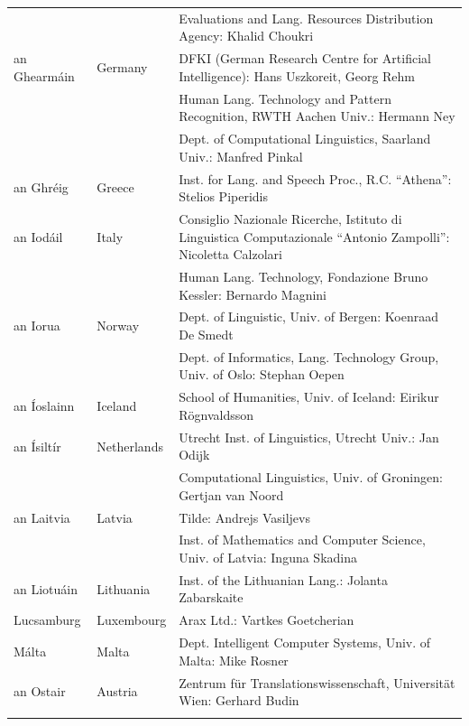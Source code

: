 \documentclass[]{../../metanetpaper}
\begin{document}
\begin{longtable}{llp{105mm}}
  & & Evaluations and Lang. Resources Distribution Agency: Khalid Choukri\\ \addlinespace
  an Ghearmáin  & \textcolor{grey1}{Germany} & DFKI (German Research Centre for Artificial Intelligence): Hans Uszkoreit, Georg Rehm\\ \addlinespace
  & & Human Lang. Technology and Pattern Recognition, RWTH Aachen Univ.: Hermann Ney \\ \addlinespace
  & & Dept. of Computational Linguistics, Saarland Univ.: Manfred Pinkal\\ \addlinespace 
  an Ghréig & \textcolor{grey1}{Greece} & Inst. for Lang. and Speech Proc., R.C. ``Athena'': Stelios Piperidis\\ \addlinespace
  an Iodáil & \textcolor{grey1}{Italy} & Consiglio Nazionale Ricerche, Istituto di Linguistica Computazionale ``Antonio Zampolli'': Nicoletta Calzolari\\ \addlinespace
  & & Human Lang. Technology, Fondazione Bruno Kessler: Bernardo Magnini\\ \addlinespace 
  an Iorua & \textcolor{grey1}{Norway} & Dept. of Linguistic, Univ. of Bergen: Koenraad De Smedt\\ \addlinespace
  & & Dept. of Informatics, Lang. Technology Group, Univ. of Oslo: Stephan Oepen \\ \addlinespace 
  an Íoslainn & \textcolor{grey1}{Iceland} & School of Humanities, Univ. of Iceland: Eirikur Rögnvaldsson\\ \addlinespace
  an Ísiltír & \textcolor{grey1}{Netherlands} & Utrecht Inst. of Linguistics, Utrecht Univ.: Jan Odijk\\ \addlinespace
  & & Computational Linguistics, Univ. of Groningen: Gertjan van Noord\\ \addlinespace 
  an Laitvia & \textcolor{grey1}{Latvia} & Tilde: Andrejs Vasiljevs\\ \addlinespace 
  & & Inst. of Mathematics and Computer Science, Univ. of Latvia: Inguna Skadina\\ \addlinespace
  an Liotuáin & \textcolor{grey1}{Lithuania} & Inst. of the Lithuanian Lang.: Jolanta Zabarskaite\\ \addlinespace
  Lucsamburg & \textcolor{grey1}{Luxembourg} & Arax Ltd.: Vartkes Goetcherian\\ \addlinespace
  Málta & \textcolor{grey1}{Malta} & Dept. Intelligent Computer Systems, Univ. of Malta: Mike Rosner\\ \addlinespace
  an Ostair & \textcolor{grey1}{Austria} & Zentrum für Translationswissenschaft, Universität Wien: Gerhard Budin\\ \addlinespace 

\end{longtable}
\end{document}

